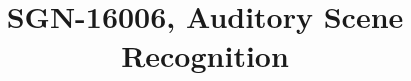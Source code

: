 \documentclass{article}
\title{SGN-16006,
  Auditory Scene Recognition
}
\begin{document}
\maketitle
\sloppy


% 

% 


\small

\printbibliography{}

\vfill\pagebreak
\end{document}
